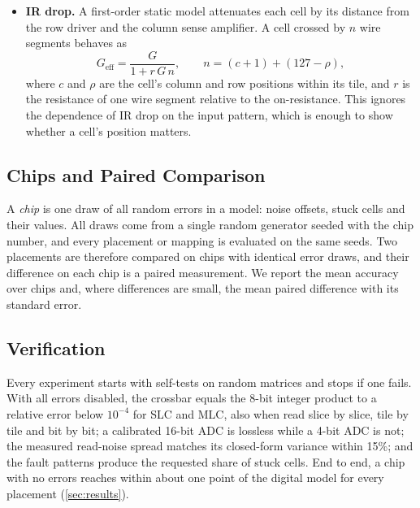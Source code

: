 \begin{itemize}
\item \textbf{IR drop.} A first-order static model attenuates each cell by its distance from the row
driver and the column sense amplifier. A cell crossed by $n$ wire segments behaves as
\begin{equation}
G_{\text{eff}}=\frac{G}{1+r\,G\,n},\qquad n=(c+1)+(127-\rho),
\label{eq:irdrop}
\end{equation}
where $c$ and $\rho$ are the cell's column and row positions within its tile, and $r$ is the resistance
of one wire segment relative to the on-resistance. This ignores the dependence of IR drop on the input
pattern, which is enough to show whether a cell's position matters.
\end{itemize}

\subsection{Chips and Paired Comparison}
A \emph{chip} is one draw of all random errors in a model: noise offsets, stuck cells and their values.
All draws come from a single random generator seeded with the chip number, and every placement or
mapping is evaluated on the same seeds. Two placements are therefore compared on chips with identical
error draws, and their difference on each chip is a paired measurement. We report the mean accuracy
over chips and, where differences are small, the mean paired difference with its standard error.

\subsection{Verification}
Every experiment starts with self-tests on random matrices and stops if one fails. With all errors
disabled, the crossbar equals the 8-bit integer product to a relative error below $10^{-4}$ for SLC and
MLC, also when read slice by slice, tile by tile and bit by bit; a calibrated 16-bit ADC is lossless while
a 4-bit ADC is not; the measured read-noise spread matches its closed-form variance within 15\%; and the
fault patterns produce the requested share of stuck cells. End to end, a chip with no errors reaches within
about one point of the digital model for every placement (\cref{sec:results}).
